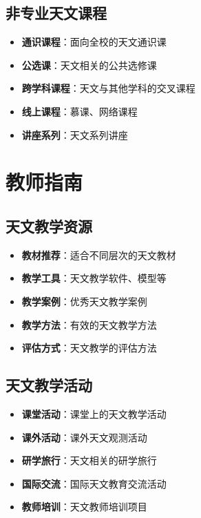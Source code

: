 \documentclass[12pt,UTF8]{ctexbook}
\begin{document}
\section{非专业天文课程}

\begin{itemize}
  \item \textbf{通识课程}：面向全校的天文通识课
  \item \textbf{公选课}：天文相关的公共选修课
  \item \textbf{跨学科课程}：天文与其他学科的交叉课程
  \item \textbf{线上课程}：慕课、网络课程
  \item \textbf{讲座系列}：天文系列讲座
\end{itemize}

\chapter{教师指南}
\section{天文教学资源}

\begin{itemize}
  \item \textbf{教材推荐}：适合不同层次的天文教材
  \item \textbf{教学工具}：天文教学软件、模型等
  \item \textbf{教学案例}：优秀天文教学案例
  \item \textbf{教学方法}：有效的天文教学方法
  \item \textbf{评估方式}：天文教学的评估方法
\end{itemize}

\section{天文教学活动}

\begin{itemize}
  \item \textbf{课堂活动}：课堂上的天文教学活动
  \item \textbf{课外活动}：课外天文观测活动
  \item \textbf{研学旅行}：天文相关的研学旅行
  \item \textbf{国际交流}：国际天文教育交流活动
  \item \textbf{教师培训}：天文教师培训项目
\end{itemize}
\end{document}
